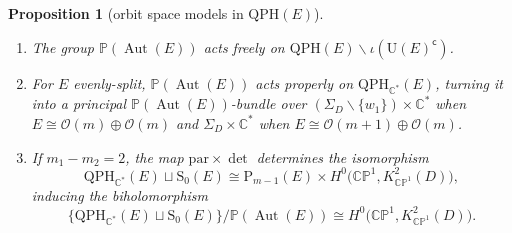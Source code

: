 \documentclass[pdftex]{sigma}
\newcommand{\field}[1]{\ensuremath{\mathbb{#1}}}
\newcommand{\CC}{\field{C}}
\newcommand{\PP}{\field{P}}
\newcommand{\calO}{\mathcal{O}}
\DeclareMathOperator{\Aut}{Aut}
\numberwithin{equation}{section}
\newtheorem{Proposition}[Theorem]{Proposition}
 { \theoremstyle{definition}
\newtheorem{Definition}[Theorem]{Definition}
\newtheorem{Note}[Theorem]{Note}
\newtheorem{Example}[Theorem]{Example}
\newtheorem{Remark}[Theorem]{Remark} }
\begin{document}
{\samepage\begin{Proposition}[orbit space models in $\mathrm{QPH}(E)$]\label{prop:orbit-bulk}\quad
\begin{enumerate}\itemsep=0pt
\item[$(i)$] The group $\PP(\Aut(E))$ acts freely on $\mathrm{QPH}(E)\backslash\iota(\mathrm{U}(E)^{\mathsf{c}})$.
\item[$(ii)$] For $E$ evenly-split, $\PP(\Aut(E))$ acts properly on
$\mathrm{QPH}_{\CC^{*}}(E)$, turning it into a principal $\PP(\Aut(E))$-bundle over $(\Sigma_{D}\backslash\{w_{1}\})\times \CC^{*}$ when $E\cong\calO(m)\oplus\calO(m)$ and $\Sigma_{D}\times \CC^{*}$ when $E\cong\calO(m+1)\oplus\calO(m)$.
\item[$(iii)$] If $m_{1}-m_{2}=2$, the map $\mathrm{par}\times \det$ determines the isomorphism
\[
\mathrm{QPH}_{\CC^{*}}(E)\sqcup \mathrm{S}_{0}(E)\cong\mathrm{P}_{m-1}(E)\times H^{0}\bigl(\CC\PP^{1},K_{\CC\PP^{1}}^{2}(D)\bigr),
\]
inducing the biholomorphism
\[
\bigl\{\mathrm{QPH}_{\CC^{*}}(E)\sqcup \mathrm{S}_{0}(E)\bigr\}/\PP(\Aut(E))\cong H^{0}\bigl(\CC\PP^{1},K_{\CC\PP^{1}}^{2}(D)\bigr).
\]
\end{enumerate}
\end{Proposition}}
\end{document}
